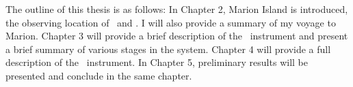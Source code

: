 	    
	    The outline of this thesis is as follows: In Chapter 2, 
	    Marion Island is introduced, the observing location of \prizm\ and \albatros. I will also provide a summary of my voyage to Marion. Chapter 3 will provide a brief description of the \prizm\ instrument and present a brief summary of various stages in the system. Chapter 4 will provide a full description of the \albatros\ instrument. In Chapter 5, preliminary results will be presented and conclude in the same chapter.  
 
